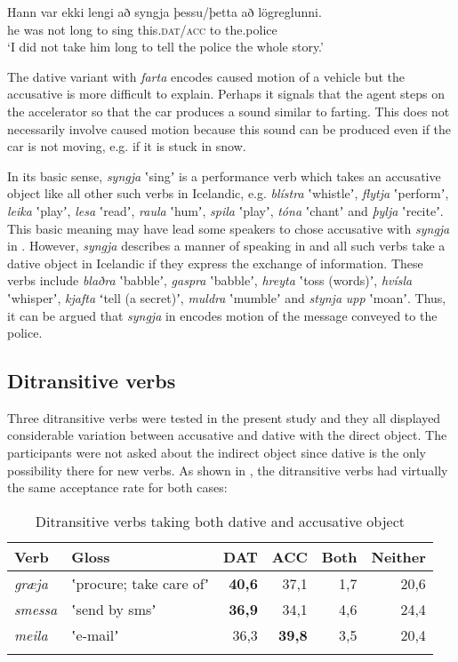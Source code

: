 \documentclass[output=paper,modfonts,nonflat,colorlinks,citecolor=brown]{langsci/langscibook}
\begin{document}
\ex  \label{ex:jonsson:8b}
\gll   Hann  var  ekki  lengi  að  syngja  þessu/þetta  að  lögreglunni.  \\
 he  was  not  long  to  sing  this.\textsc{dat/acc}  to  the.police  \\
\glt `I did not take him long to tell the police the whole story.'
\z
\z

The dative variant with \textit{farta} encodes caused motion of a vehicle but the accusative is more difficult to explain. Perhaps it signals that the agent steps on the accelerator so that the car produces a sound similar to farting. This does not necessarily involve caused motion because this sound can be produced even if the car is not moving, e.g. if it is stuck in snow.

In its basic sense, \textit{syngja} ʽsingʼ is a performance verb which takes an accusative object like all other such verbs in Icelandic, e.g. \textit{blístra} ʽwhistleʼ, \textit{flytja} ʽperformʼ, \textit{leika} ʽplayʼ, \textit{lesa} ʽreadʼ, \textit{raula} ʽhumʼ, \textit{spila} ʽplayʼ, \textit{tóna} ʽchantʼ and \textit{þylja} ʽreciteʼ. This basic meaning may have lead some speakers to chose accusative with \textit{syngja} in . However, \textit{syngja} describes a manner of speaking in  and all such verbs take a dative object in Icelandic if they express the exchange of information. These verbs include \textit{blaðra} ʽbabbleʼ,  \textit{gaspra} ʽbabbleʼ, \textit{hreyta} ʽtoss (words)ʼ, \textit{hvísla} ʽwhisperʼ, \textit{kjafta} ʻtell (a secret)ʼ, \textit{muldra} ʽmumbleʼ and \textit{stynja} \textit{upp} ʽmoanʼ. Thus, it can be argued that \textit{syngja} in  encodes motion of the message conveyed to the police.

\subsection{Ditransitive verbs} %
\label{sec:jonsson:4.2}

Three ditransitive verbs were tested in the present study and they all displayed considerable variation between accusative and dative with the direct object. The participants were not asked about the indirect object since dative is the only possibility there for new verbs. As shown in , the ditransitive verbs had virtually the same acceptance rate for both cases:

\begin{table}
{\caption{\label{tab:jonsson:5}Ditransitive verbs taking both dative and accusative object}}
\begin{tabularx}{\textwidth}{XXrrrr}
\lsptoprule
Verb & Gloss & DAT & ACC & Both & Neither\\
\midrule
\textit{græja} & ʽprocure; take care ofʼ & \textbf{40,6} & 37,1 & 1,7 & 20,6\\
\textit{smessa} & ʽsend by smsʼ & \textbf{36,9} & 34,1 & 4,6 & 24,4\\
\textit{meila} & ʽe-mailʼ & 36,3 & \textbf{39,8} & 3,5 & 20,4\\
\lspbottomrule
\end{tabularx}
\end{table}
\end{document}
